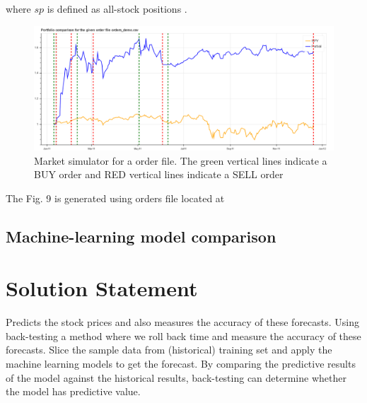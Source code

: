\documentclass[12pt]{article}
\begin{document}
\begin{itemize}
where $sp$ is defined as all-stock positions \cite{GeTechCourse}. 

\begin{figure}[!htbp]
\label{fig:optimized}
\begin{center}
\includegraphics[height=0.5\textheight,width=\textwidth]{market.png}
\caption{Market simulator for a order file. The green vertical lines indicate a BUY order and RED vertical lines indicate a SELL order }
\end{center}
\end{figure}

The Fig. 9 is generated using orders file located at \href{https://github.com/beegeesquare/QuantFy/blob/master/orders/orders_demo.csv}{\color{blue}{\bf Orders-demo}}

\subsection{Machine-learning model comparison}

\section{Solution Statement}
\label{sec:solution}
Predicts the stock prices and also measures the accuracy of these forecasts. Using back-testing a method where we roll back time and measure the accuracy of these forecasts.  Slice the sample data from (historical) training set and apply the machine learning models to get the forecast.  By comparing the predictive results of the model against the historical results,  back-testing can determine whether the model has predictive value. 










\end{itemize}
\end{document}
